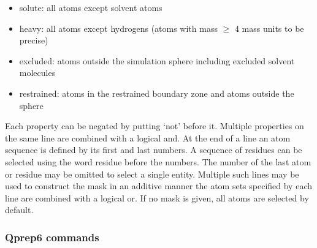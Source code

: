 \documentclass[a4paper,11pt]{article}
\begin{document}
\begin{itemize}
\item solute: all atoms except solvent atoms
\item heavy: all atoms except hydrogens (atoms with mass $\ge$ 4 mass units to be precise)
\item excluded: atoms outside the simulation sphere including excluded solvent molecules
\item restrained: atoms in the restrained boundary zone and atoms outside the sphere
\end{itemize}

Each property can be negated by putting `not' before it. Multiple
properties on the same line are combined with a logical and. At
the end of a line an atom sequence is defined by its first and
last numbers. A sequence of residues can be selected using the
word residue before the numbers. The number of the last atom or
residue may be omitted to select a single entity. Multiple such
lines may be used to construct the mask in an additive manner {\-}
the atom sets specified by each line are combined with a logical
or. If no mask is given, all atoms are selected by default.

\subsubsection{\textbf{Qprep6} commands}
\end{document}

